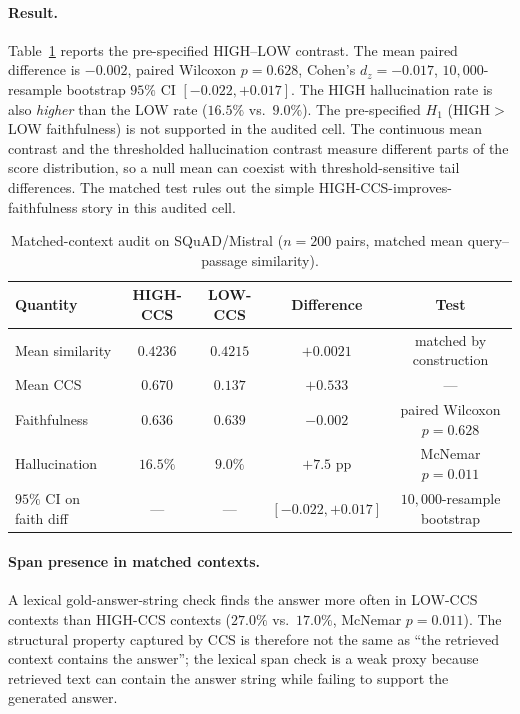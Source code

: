 \paragraph{Result.} Table~\ref{tab:matched_ccs_main} reports the
pre-specified HIGH--LOW contrast. The mean paired difference is
$-0.002$, paired Wilcoxon $p = 0.628$, Cohen's $d_z = -0.017$,
$10{,}000$-resample bootstrap $95\%$ CI $[-0.022, +0.017]$. The HIGH
hallucination rate is also \emph{higher} than the LOW rate
($16.5\%$ vs.\ $9.0\%$). The pre-specified $H_1$
(HIGH$>$LOW faithfulness) is not supported in the audited cell. The
continuous mean contrast and the thresholded hallucination contrast
measure different parts of the score distribution, so a null mean can
coexist with threshold-sensitive tail differences. The matched test
rules out the simple HIGH-CCS-improves-faithfulness story in this
audited cell.

\begin{table}[!htb]
\centering
\caption{Matched-context audit on SQuAD/Mistral ($n{=}200$ pairs,
matched mean query--passage similarity).}
\label{tab:matched_ccs_main}
\footnotesize
\begin{tabular}{lcccc}
\toprule
Quantity & HIGH-CCS & LOW-CCS & Difference & Test \\
\midrule
Mean similarity & $0.4236$ & $0.4215$ & $+0.0021$ & matched by construction \\
Mean CCS        & $0.670$  & $0.137$  & $+0.533$  & --- \\
Faithfulness    & $0.636$  & $0.639$  & $-0.002$  & paired Wilcoxon $p=0.628$ \\
Hallucination   & $16.5\%$ & $9.0\%$  & $+7.5$ pp & McNemar $p=0.011$ \\
$95\%$ CI on faith diff & --- & --- & $[-0.022, +0.017]$ & $10{,}000$-resample bootstrap \\
\bottomrule
\end{tabular}
\end{table}

\paragraph{Span presence in matched contexts.} A lexical
gold-answer-string check finds the answer more often in LOW-CCS
contexts than HIGH-CCS contexts ($27.0\%$ vs.\ $17.0\%$, McNemar
$p=0.011$). The structural property captured by CCS is therefore not
the same as ``the retrieved context contains the answer''; the
lexical span check is a weak proxy because retrieved text can contain
the answer string while failing to support the generated answer.


